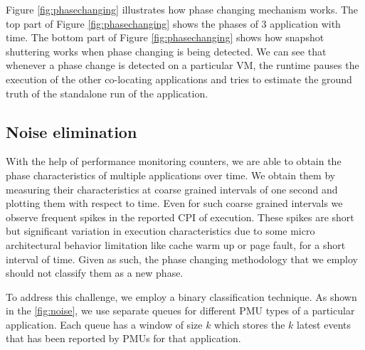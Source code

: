 \documentclass[pageno]{jpaper}
\begin{document}
Figure \ref{fig:phasechanging} illustrates how phase changing mechanism works. The top part of Figure \ref{fig:phasechanging} shows the phases of 3 application with time. The bottom part of Figure \ref{fig:phasechanging} shows how snapshot shuttering works when phase changing is being detected. We can see that whenever a phase change is detected on a particular VM, the runtime pauses the execution of the other co-locating applications and tries to estimate the ground truth of the standalone run of the application.
\begin{figure*}
\centering
\begin{minipage}[t]{1\columnwidth}
\centering
{}
\caption{Shows how shuttering is done based on phase changing methedology \vspace{-2 mm}}
\label{fig:phasechanging}
\end{minipage}
\hfill\begin{minipage}[t]{1\columnwidth}
\centering
{}
\caption{Overview of noise elimination in runtime \vspace{-12 mm}}
\label{fig:noise}
\end{minipage}
\end{figure*}
\subsection{Noise elimination}
\label{subsec:Noiseelimination}

With the help of performance monitoring counters, we are able to obtain the phase characteristics of multiple applications over time. We obtain them by measuring their characteristics at coarse grained intervals of one second and plotting them with respect to time. Even for such coarse grained intervals we observe frequent spikes in the reported CPI of execution. These spikes are short but significant variation in execution characteristics due to some micro architectural behavior limitation like cache warm up or page fault, for a short interval of time. Given as such, the phase changing methodology that we employ should not classify them as a new phase.

To address this challenge, we employ a binary classification technique. As shown in the \ref{fig:noise}, we use separate queues for different PMU types of a particular application. Each queue has a window of size $k$ which stores the $k$ latest events that has been reported by PMUs for that application.
\end{document}
